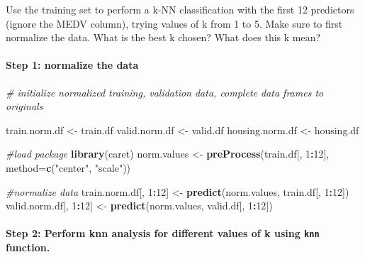 \documentclass[]{article}
\newenvironment{Shaded}{\begin{snugshade}}{\end{snugshade}}
\newcommand{\KeywordTok}[1]{\textcolor[rgb]{0.13,0.29,0.53}{\textbf{#1}}}
\newcommand{\DataTypeTok}[1]{\textcolor[rgb]{0.13,0.29,0.53}{#1}}
\newcommand{\DecValTok}[1]{\textcolor[rgb]{0.00,0.00,0.81}{#1}}
\newcommand{\StringTok}[1]{\textcolor[rgb]{0.31,0.60,0.02}{#1}}
\newcommand{\CommentTok}[1]{\textcolor[rgb]{0.56,0.35,0.01}{\textit{#1}}}
\newcommand{\OperatorTok}[1]{\textcolor[rgb]{0.81,0.36,0.00}{\textbf{#1}}}
\newcommand{\NormalTok}[1]{#1}
\let\oldparagraph\paragraph
\renewcommand{\paragraph}[1]{\oldparagraph{#1}\mbox{}}
\begin{document}
Use the training set to perform a k-NN classification with the first 12
predictors (ignore the MEDV column), trying values of k from 1 to 5.
Make sure to first normalize the data. What is the best k chosen? What
does this k mean?

\paragraph{Step 1: normalize the data}\label{step-1-normalize-the-data}

\begin{Shaded}
\begin{Highlighting}[]
\CommentTok{# initialize normalized training, validation data, complete data frames to originals}

\NormalTok{train.norm.df <-}\StringTok{ }\NormalTok{train.df}
\NormalTok{valid.norm.df <-}\StringTok{ }\NormalTok{valid.df}
\NormalTok{housing.norm.df <-}\StringTok{ }\NormalTok{housing.df}

\CommentTok{#load package}
\KeywordTok{library}\NormalTok{(caret)}
\NormalTok{norm.values <-}\StringTok{ }\KeywordTok{preProcess}\NormalTok{(train.df[, }\DecValTok{1}\OperatorTok{:}\DecValTok{12}\NormalTok{], }\DataTypeTok{method=}\KeywordTok{c}\NormalTok{(}\StringTok{"center"}\NormalTok{, }\StringTok{"scale"}\NormalTok{))}

\CommentTok{#normalize data}
\NormalTok{train.norm.df[, }\DecValTok{1}\OperatorTok{:}\DecValTok{12}\NormalTok{] <-}\StringTok{ }\KeywordTok{predict}\NormalTok{(norm.values, train.df[, }\DecValTok{1}\OperatorTok{:}\DecValTok{12}\NormalTok{])}
\NormalTok{valid.norm.df[, }\DecValTok{1}\OperatorTok{:}\DecValTok{12}\NormalTok{] <-}\StringTok{ }\KeywordTok{predict}\NormalTok{(norm.values, valid.df[, }\DecValTok{1}\OperatorTok{:}\DecValTok{12}\NormalTok{])}
\end{Highlighting}
\end{Shaded}

\paragraph{\texorpdfstring{Step 2: Perform knn analysis for different
values of k using \texttt{knn}
function.}{Step 2: Perform knn analysis for different values of k using knn function.}}\label{step-2-perform-knn-analysis-for-different-values-of-k-using-knn-function.}
\end{document}
